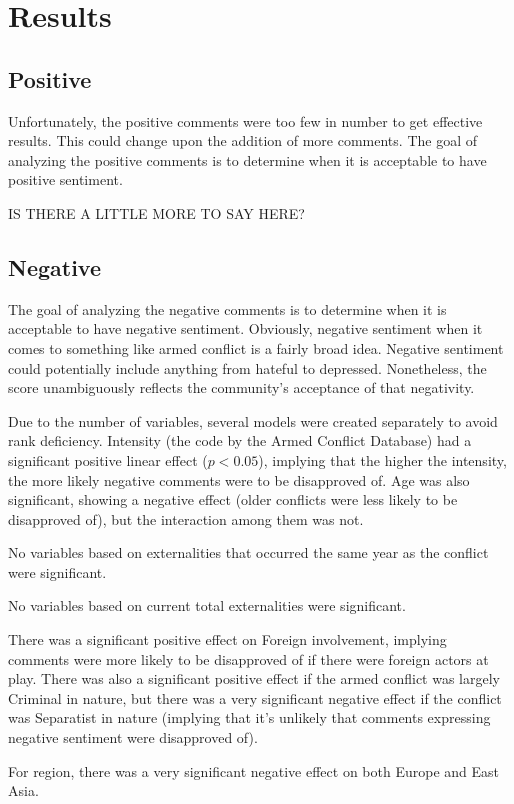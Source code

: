 \section{Results}
\subsection{Positive}
Unfortunately, the positive comments were too few in number to get effective results. This could change upon the addition of more comments. The goal of analyzing the positive comments is to determine when it is acceptable to have positive sentiment.

IS THERE A LITTLE MORE TO SAY HERE?

\subsection{Negative}
The goal of analyzing the negative comments is to determine when it is acceptable to have negative sentiment. Obviously, negative sentiment when it comes to something like armed conflict is a fairly broad idea. Negative sentiment could potentially include anything from hateful to depressed. Nonetheless, the score unambiguously reflects the community's acceptance of that negativity.

Due to the number of variables, several models were created separately to avoid rank deficiency. Intensity (the code by the Armed Conflict Database) had a significant positive linear effect ($p < 0.05$), implying that the higher the intensity, the more likely negative comments were to be disapproved of. Age was also significant, showing a negative effect (older conflicts were less likely to be disapproved of), but the interaction among them was not.

No variables based on externalities that occurred the same year as the conflict were significant.

No variables based on current total externalities were significant.

There was a significant positive effect on Foreign involvement, implying comments were more likely to be disapproved of if there were foreign actors at play. There was also a significant positive effect if the armed conflict was largely Criminal in nature, but there was a very significant negative effect if the conflict was Separatist in nature (implying that it's unlikely that comments expressing negative sentiment were disapproved of).

For region, there was a very significant negative effect on both Europe and East Asia.